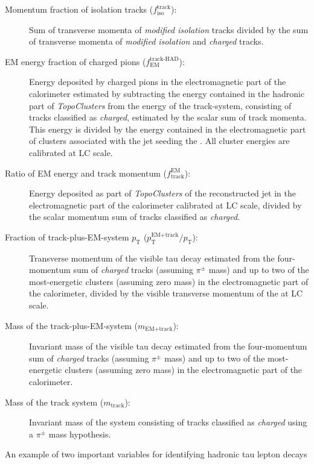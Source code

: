 \begin{description}
\item[Momentum fraction of isolation tracks ($f_\text{iso}^\text{track}$):] Sum
  of transverse momenta of \emph{modified isolation} tracks divided by the sum
  of transverse momenta of \emph{modified isolation} and \emph{charged} tracks.

\item[EM energy fraction of charged pions ($f_\text{EM}^\text{track-HAD}$):]
  Energy deposited by charged pions in the electromagnetic part of the
  calorimeter estimated by subtracting the energy contained in the hadronic part
  of \emph{TopoClusters} from the energy of the track-system, consisting of
  tracks classified as \emph{charged}, estimated by the scalar sum of track
  momenta. This energy is divided by the energy contained in the electromagnetic
  part of clusters associated with the jet seeding the \tauhadvis. All cluster
  energies are calibrated at LC scale.

\item[Ratio of EM energy and track momentum ($f_\text{track}^\text{EM}$):]
  Energy deposited as part of \emph{TopoClusters} of the reconstructed jet in
  the electromagnetic part of the calorimeter calibrated at LC scale, divided by
  the scalar momentum sum of tracks classified as \emph{charged}.

\item[Fraction of track-plus-EM-system $p_\text{T}$
  ($p_\text{T}^\text{EM+track} / p_\text{T}$):] Transverse momentum of the
  visible tau decay estimated from the four-momentum sum of \emph{charged}
  tracks (assuming $\pi^\pm$ mass) and up to two of the most-energetic clusters
  (assuming zero mass) in the electromagnetic part of the calorimeter, divided
  by the visible transverse momentum of the \tauhadvis at LC scale.

\item[Mass of the track-plus-EM-system ($m_\text{EM+track}$):] Invariant mass of
  the visible tau decay estimated from the four-momentum sum of \emph{charged}
  tracks (assuming $\pi^\pm$ mass) and up to two of the most-energetic clusters
  (assuming zero mass) in the electromagnetic part of the calorimeter.

\item[Mass of the track system ($m_\text{track}$):] Invariant mass of the system
  consisting of tracks classified as \emph{charged} using a $\pi^\pm$ mass
  hypothesis.
\end{description}
An example of two important variables for identifying hadronic tau lepton decays
